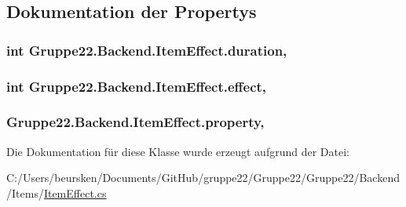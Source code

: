 \subsection{Dokumentation der Propertys}
\hypertarget{class_gruppe22_1_1_backend_1_1_item_effect_ae7de32850a9a94a778eae3155e39add0}{
\subsubsection[{duration}]{\setlength{\rightskip}{0pt plus 5cm}int Gruppe22.\-Backend.\-Item\-Effect.\-duration\hspace{0.3cm}{\ttfamily [get]}, {\ttfamily [set]}}}\label{class_gruppe22_1_1_backend_1_1_item_effect_ae7de32850a9a94a778eae3155e39add0}
\hypertarget{class_gruppe22_1_1_backend_1_1_item_effect_a9b6897a13e8e7b82698a90c4164d7ad4}{
\subsubsection[{effect}]{\setlength{\rightskip}{0pt plus 5cm}int Gruppe22.\-Backend.\-Item\-Effect.\-effect\hspace{0.3cm}{\ttfamily [get]}, {\ttfamily [set]}}}\label{class_gruppe22_1_1_backend_1_1_item_effect_a9b6897a13e8e7b82698a90c4164d7ad4}
\hypertarget{class_gruppe22_1_1_backend_1_1_item_effect_ac58e4514f7c82e466da52ca6b03925cd}{
\subsubsection[{property}]{ Gruppe22.\-Backend.\-Item\-Effect.\-property\hspace{0.3cm}{\ttfamily [get]}, {\ttfamily [set]}}}\label{class_gruppe22_1_1_backend_1_1_item_effect_ac58e4514f7c82e466da52ca6b03925cd}


Die Dokumentation für diese Klasse wurde erzeugt aufgrund der Datei\-:\begin{DoxyCompactItemize}
\item 
C\-:/\-Users/beursken/\-Documents/\-Git\-Hub/gruppe22/\-Gruppe22/\-Gruppe22/\-Backend/\-Items/\hyperlink{_item_effect_8cs}{Item\-Effect.\-cs}\end{DoxyCompactItemize}
